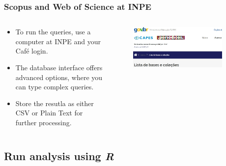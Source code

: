 \documentclass[aspectratio=169]{beamer}
\begin{document}
\begin{frame}
	\frametitle{Scopus and Web of Science at INPE}
	\begin{columns}
		\begin{column}{0.5\textwidth}
			\begin{itemize}
				\item To run the queries, use a computer at INPE and your Café 
                    login.
                \item The database interface offers advanced options, where you
                    can type complex queries.
                \item Store the resutla as either CSV or Plain Text for 
                    further processing.
			\end{itemize}
		\end{column}
		\begin{column}{0.5\textwidth}
			\begin{figure}
				\centering
				\includegraphics[width=0.9\textwidth]{img/inpe_cafe.png}
			\end{figure}
		\end{column}
	\end{columns}
\end{frame}

\subsection{Run analysis using \textit{R}}
\end{document}
